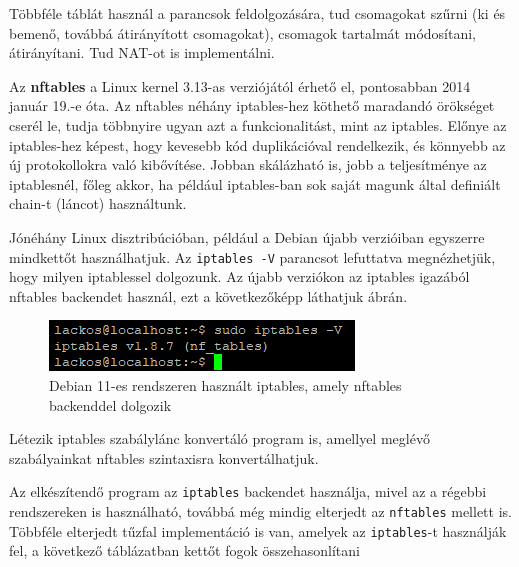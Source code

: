 Többféle táblát használ a parancsok feldolgozására, tud csomagokat szűrni (ki és bemenő, továbbá átirányított csomagokat), csomagok tartalmát módosítani, átirányítani. Tud NAT-ot is implementálni. \cite{iptables_man}

Az \textbf{nftables} a Linux kernel 3.13-as verziójától érhető el, pontosabban 2014 január 19.-e óta. Az nftables néhány iptables-hez köthető maradandó örökséget cserél le, tudja többnyire ugyan azt a funkcionalitást, mint az iptables. Előnye az iptables-hez képest, hogy kevesebb kód duplikációval rendelkezik, és könnyebb az új protokollokra való kibővítése. \cite{nftables}
Jobban skálázható is, jobb a teljesítménye az iptablesnél, főleg akkor, ha például iptables-ban sok saját magunk által definiált chain-t (láncot) használtunk.

Jónéhány Linux disztribúcióban, például a Debian újabb verzióiban egyszerre mindkettőt használhatjuk. Az \texttt{iptables -V} parancsot lefuttatva megnézhetjük, hogy milyen iptablessel dolgozunk. Az újabb verziókon az iptables igazából nftables backendet használ, ezt a következőképp láthatjuk  ábrán.
\begin{figure}[h]
\centering
\includegraphics[scale=1.0]{images/iptables_nftables.png}
\caption{Debian 11-es rendszeren használt iptables, amely nftables backenddel dolgozik}
\label{fig:iptables_nftables}
\end{figure}

Létezik iptables szabálylánc konvertáló program is, amellyel meglévő szabályainkat nftables szintaxisra konvertálhatjuk. 

Az elkészítendő program az \texttt{iptables} backendet használja, mivel az a régebbi rendszereken is használható, továbbá még mindig elterjedt az \texttt{nftables} mellett is. Többféle elterjedt tűzfal implementáció is van, amelyek az \texttt{iptables}-t használják fel, a következő  táblázatban kettőt fogok összehasonlítani

